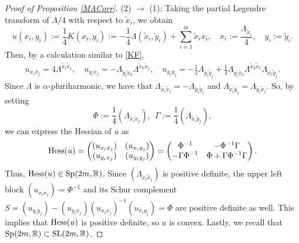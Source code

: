\documentclass[11pt,reqno]{amsart}
\newcommand{\R}{\mathbb{R}}
\theoremstyle{plain}
\theoremstyle{definition}
\numberwithin{equation}{section}
\begin{document}
\begin{proof}[Proof of Proposition \ref{MACorr}]
(2) $\longrightarrow$ (1): Taking the partial Legendre transform of $\Lambda/4$ with respect to $\tilde{x}_{i}$, we obtain
$$u(x_i,y_i):=\frac{1}{4}K(x_i,y_i):=-\frac{1}{4}\Lambda(\tilde{x}_i,\tilde{y}_i)+\sum_{i=1}^{m} \tilde{x}_{i}x_{i}, \quad x_{i}:=\frac{\Lambda_{\tilde{x}_{i}}}{4} ,\quad  y_{i}:=\tilde{y}_{i}.$$
Then, by a calculation similar to \eqref{KF},
\begin{align*}
   u_{x_i x_j} =  4\Lambda^{\tilde{x}_{i}\tilde{x}_{j}}, \quad 
   u_{y_i x_j}  =  -\Lambda_{\tilde{y}_i \tilde{x}_k}\Lambda^{\tilde{x}_{k}\tilde{x}_{j}}, \quad
   u_{y_i y_j}  =  \displaystyle  -\frac{1}{4}\Lambda_{\tilde{y}_i\tilde{y}_j}+\displaystyle \frac{1}{4} \Lambda_{\tilde{y}_{i}\tilde{x}_{k}}\Lambda^{\tilde{x}_{k}\tilde{x}_{\ell}}\Lambda_{\tilde{x}_{\ell}{\tilde{y}}_{j}}.
\end{align*}
Since $\Lambda$ is $\alpha$-pluriharmonic, we have that $\Lambda_{\tilde{x}_{i}\tilde{x}_{j}}=-\Lambda_{\tilde{y}_{i}\tilde{y}_{j}}$ and $\Lambda_{\tilde{x}_{i}\tilde{y}_{j}}=\Lambda_{\tilde{y}_{i}\tilde{x}_{j}}$. So, by setting
   $$\Phi:=\frac{1}{4}(\Lambda_{\tilde{x}_{i}\tilde{x}_{j}}) , \ \ \Gamma:=\frac{1}{4}(\Lambda_{\tilde{x}_{i}\tilde{y}_{j}}),$$
we can express the Hessian of $u$ as
   $$
     {\rm Hess}(u)  = \begin{pmatrix}
     (u_{x_{i}x_{j}})  & (u_{x_{i}y_{j}})  \\
     (u_{y_{i}x_{j}})  & (u_{y_{i}y_{j}})
     \end{pmatrix} 
    = \begin{pmatrix}
    \Phi^{-1}  & -\Phi^{-1}\Gamma   \\
    -\Gamma\Phi^{-1}  & \Phi +\Gamma \Phi^{-1} \Gamma
\end{pmatrix}. $$
   Thus, ${\rm Hess}(u)\in {\rm Sp}(2m,\R)$. Since $(\Lambda_{\tilde{x}_{i}\tilde{x}_{j}})$ is positive definite, the upper left block $(u_{x_{i}x_{j}})=\Phi^{-1}$ and its Schur complement $S=(u_{y_{i}y_{j}})-(u_{y_{i}x_{j}})(u_{x_{i}x_{j}})^{-1}(u_{x_{i}y_{j}})=\Phi$ are positive definite as well. This implies that ${\rm Hess}(u)$ is positive definite, so $u$ is convex. Lastly, we recall that ${\rm Sp}(2m,\mathbb{R}) \subset {\rm SL}(2m,\mathbb{R})$.
\end{proof}
\end{document}
